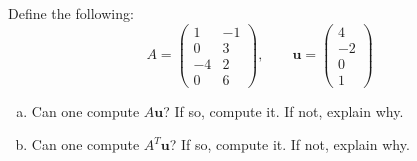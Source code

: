 \documentclass[11pt,letterpaper]{article}
\begin{document}
\newpage



 Define the following:
	\[
	A= \begin{pmatrix} 1 & -1 \\ 0 & 3 \\ -4 & 2 \\ 0 & 6 \end{pmatrix}, \qquad
	\mathbf{u}= \begin{pmatrix} 4 \\ -2 \\ 0 \\ 1 \end{pmatrix}
	\]

\begin{enumerate}[(a)]
\item Can one compute $A\mathbf{u}$? If so, compute it. If not, explain why. 
\item Can one compute $A^T\mathbf{u}$? If so, compute it. If not, explain why. 
\end{enumerate} \pspace
\end{document}
